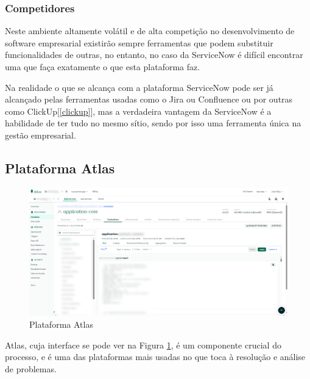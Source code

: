         \subsubsection{Competidores}\label{competidores-service-now} %
    
            Neste ambiente altamente volátil e de alta competição no desenvolvimento de software empresarial existirão sempre ferramentas que podem substituir funcionalidades de outras, no entanto, no caso da ServiceNow é difícil encontrar uma que faça exatamente o que esta plataforma faz. 
            
            Na realidade o que se alcança com a plataforma ServiceNow pode ser já alcançado pelas ferramentas usadas como o Jira ou Confluence ou por outras como ClickUp[\ref{clickup}], mas a verdadeira vantagem da ServiceNow é a habilidade de ter tudo no mesmo sítio, sendo por isso uma ferramenta única na gestão empresarial.

    \subsection{Plataforma Atlas}\label{sec:ferramentas-atlas}

        \begin{figure}[htbp]
            \centering
            \includegraphics[width=\textwidth]{imgs/MongoDB.png} %
            \caption{Plataforma Atlas}\label{fig:atlas-ui}
        \end{figure}

        Atlas, cuja interface se pode ver na Figura \ref{fig:atlas-ui}, é um componente crucial do processo, e é uma das plataformas mais usadas no que toca à resolução e análise de problemas.  
        
